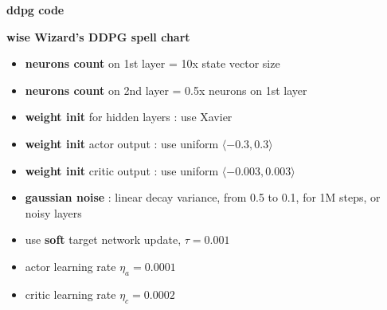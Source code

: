 \documentclass[xcolor=dvipsnames]{beamer}
\begin{document}
\begin{frame}{\bf ddpg code}

  
\end{frame}


\begin{frame}{\bf wise Wizard's DDPG spell chart}
  \begin{itemize}
    \item {\bf \color{red} neurons count} on 1st layer = 10x  state vector size
    \item {\bf \color{red} neurons count} on 2nd layer = 0.5x neurons on 1st layer
    \item {\bf \color{red} weight init} for hidden layers : use Xavier
    \item {\bf \color{red} weight init} actor output  : use uniform $\langle -0.3, 0.3 \rangle$
    \item {\bf \color{red} weight init} critic output : use uniform $\langle -0.003, 0.003 \rangle$
    \item {\bf \color{red} gaussian noise} : linear decay variance, from 0.5 to 0.1, for 1M steps, or noisy layers
    \item use {\bf \color{red} soft} target network update, $\tau = 0.001$
    \item actor learning rate $\eta_a = 0.0001$
    \item critic learning rate $\eta_c = 0.0002$
  \end{itemize}
\end{frame}
\end{document}
